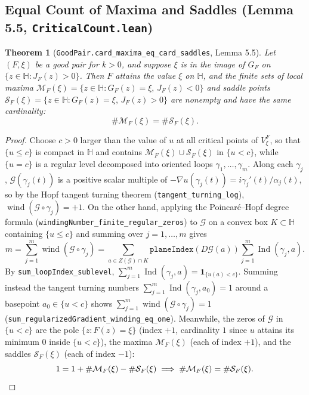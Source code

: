 \documentclass[11pt,reqno]{amsart}
\newtheorem{theorem}{Theorem}[section]
\theoremstyle{definition}
\newcommand{\uhp}{\mathbb{H}}
\newcommand{\wind}{\operatorname{wind}}
\newcommand{\ind}{\operatorname{Ind}}
\begin{document}
\subsection{Equal Count of Maxima and Saddles (Lemma 5.5, \texttt{CriticalCount.lean})}

\begin{theorem}[\texttt{GoodPair.card\_maxima\_eq\_card\_saddles}, Lemma 5.5]
Let $(F,\xi)$ be a good pair for $k > 0$, and suppose $\xi$ is in the image of $G_F$ on $\{z \in \uhp : J_F(z) > 0\}$. Then $F$ attains the value $\xi$ on $\uhp$, and the finite sets of local maxima $\mathcal{M}_F(\xi) = \{z \in \uhp : G_F(z)=\xi,\, J_F(z) < 0\}$ and saddle points $\mathcal{S}_F(\xi) = \{z \in \uhp : G_F(z)=\xi,\, J_F(z) > 0\}$ are nonempty and have the same cardinality:
\[
\#\mathcal{M}_F(\xi) = \#\mathcal{S}_F(\xi).
\]
\end{theorem}
\begin{proof}
Choose $c > 0$ larger than the value of $u$ at all critical points of $V_\xi^F$, so that $\{u \le c\}$ is compact in $\uhp$ and contains $\mathcal{M}_F(\xi) \cup \mathcal{S}_F(\xi)$ in $\{u < c\}$, while $\{u = c\}$ is a regular level decomposed into oriented loops $\gamma_1,\dots,\gamma_m$. Along each $\gamma_j$, $\mathcal{G}(\gamma_j(t))$ is a positive scalar multiple of $-\nabla u(\gamma_j(t)) = i \gamma_j'(t) / \alpha_j(t)$, so by the Hopf tangent turning theorem (\texttt{tangent\_turning\_log}), $\wind(\mathcal{G} \circ \gamma_j) = +1$. On the other hand, applying the Poincaré--Hopf degree formula (\texttt{windingNumber\_finite\_regular\_zeros}) to $\mathcal{G}$ on a convex box $K \subset \uhp$ containing $\{u \le c\}$ and summing over $j=1,\dots,m$ gives
\[
m = \sum_{j=1}^m \wind(\mathcal{G} \circ \gamma_j) = \sum_{a \in Z(\mathcal{G}) \cap K} \texttt{planeIndex}(D\mathcal{G}(a)) \sum_{j=1}^m \ind(\gamma_j, a).
\]
By \texttt{sum\_loopIndex\_sublevel}, $\sum_{j=1}^m \ind(\gamma_j, a) = \mathbf{1}_{\{u(a) < c\}}$. Summing instead the tangent turning numbers $\sum_{j=1}^m \ind(\gamma_j, a_0) = 1$ around a basepoint $a_0 \in \{u < c\}$ shows $\sum_{j=1}^m \wind(\mathcal{G} \circ \gamma_j) = 1$ (\texttt{sum\_regularizedGradient\_winding\_eq\_one}). Meanwhile, the zeros of $\mathcal{G}$ in $\{u < c\}$ are the pole $\{z : F(z)=\xi\}$ (index $+1$, cardinality $1$ since $u$ attains its minimum $0$ inside $\{u < c\}$), the maxima $\mathcal{M}_F(\xi)$ (each of index $+1$), and the saddles $\mathcal{S}_F(\xi)$ (each of index $-1$):
\[
1 = 1 + \#\mathcal{M}_F(\xi) - \#\mathcal{S}_F(\xi) \implies \#\mathcal{M}_F(\xi) = \#\mathcal{S}_F(\xi). \qedhere
\]
\end{proof}
\end{document}
